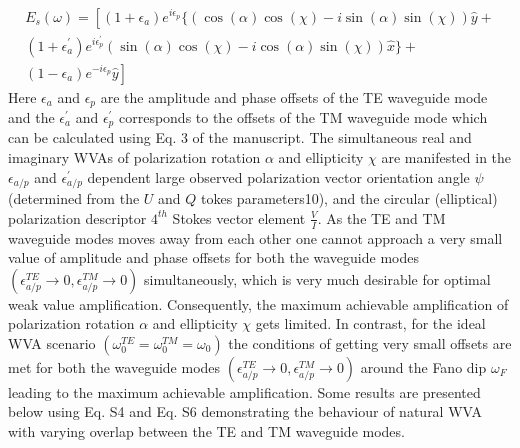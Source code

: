 \documentclass[13pt]{article}
\begin{document}
\begin{multline}
	E_s(\omega) = \left[ (1 + \epsilon_a) e^{i\epsilon_p} \{ (\cos(\alpha)\cos(\chi) - i\sin(\alpha)\sin(\chi)) \hat{y} + \right. \\
	\left. (1 + \epsilon^{'}_a) e^{i\epsilon^{'}_p} (\sin(\alpha)\cos(\chi) - i\cos(\alpha)\sin(\chi)) \hat{x} \} + \right. \\
	\left. (1 - \epsilon_a) e^{-i\epsilon_p} \hat{y} \right]
	\label{eqs:WVA Electric field offset}
\end{multline}
	Here $\epsilon_a$ and $\epsilon_p$ are the amplitude and phase offsets of the TE waveguide mode and the  $\epsilon^{'}_a$ and $\epsilon^{'}_p$ corresponds to the offsets of the TM waveguide mode which can be calculated using Eq. 3 of the manuscript.  The simultaneous real and imaginary WVAs of polarization rotation $\alpha$ and ellipticity $\chi$ are  manifested  in  the $\epsilon_{a/p}$ and $\epsilon^{'}_{a/p}$ dependent  large  observed  polarization  vector  orientation angle $\psi$ (determined from the $U$ and $Q$ tokes parameters10), and the circular (elliptical) polarization descriptor $4^{th}$ Stokes vector element $\frac{V}{I}$. As the TE and TM waveguide modes moves away from each other one cannot approach a very small value of amplitude and phase offsets for both  the  waveguide  modes $(\epsilon_{a/p}^{TE} \rightarrow 0, \epsilon_{a/p}^{TM} \rightarrow 0)$ simultaneously,  which  is  very  much desirable for optimal weak value amplification. Consequently, the maximum achievable amplification  of  polarization  rotation $\alpha$ and  ellipticity $\chi$ gets  limited.  In  contrast,  for  the  ideal WVA scenario $(\omega_0^{TE} = \omega_0^{TM} = \omega_0)$ the conditions of getting very small offsets are met for both the waveguide modes $(\epsilon_{a/p}^{TE} \rightarrow 0, \epsilon_{a/p}^{TM} \rightarrow 0)$ around the Fano dip $\omega_F$ leading to the maximum  achievable  amplification.  Some  results  are  presented  below  using  Eq.  S4 and  Eq.  S6 demonstrating  the  behaviour  of  natural  WVA  with  varying  overlap  between  the  TE  and  TM waveguide modes.
\end{document}
